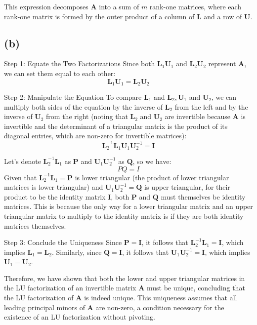 \documentclass{article}
\begin{document}
This expression decomposes $\boldsymbol{A}$ into a sum of $m$ rank-one matrices, where each rank-one matrix is formed by the outer product of a column of $\boldsymbol{L}$ and a row of $\boldsymbol{U}$.
\subsection{(b)}
Step 1: Equate the Two Factorizations
Since both $\boldsymbol{L}_1 \boldsymbol{U}_1$ and $\boldsymbol{L}_2 \boldsymbol{U}_2$ represent $\boldsymbol{A}$, we can set them equal to each other:
$$
\boldsymbol{L}_1 \boldsymbol{U}_1=\boldsymbol{L}_2 \boldsymbol{U}_2
$$

Step 2: Manipulate the Equation
To compare $\boldsymbol{L}_1$ and $\boldsymbol{L}_2, \boldsymbol{U}_1$ and $\boldsymbol{U}_2$, we can multiply both sides of the equation by the inverse of $\boldsymbol{L}_2$ from the left and by the inverse of $\boldsymbol{U}_2$ from the right (noting that $\boldsymbol{L}_2$ and $\boldsymbol{U}_2$ are invertible because $\boldsymbol{A}$ is invertible and the determinant of a triangular matrix is the product of its diagonal entries, which are non-zero for invertible matrices):
$$
\boldsymbol{L}_2^{-1} \boldsymbol{L}_1 \boldsymbol{U}_1 \boldsymbol{U}_2^{-1}=\boldsymbol{I}
$$

Let's denote $\boldsymbol{L}_2^{-1} \boldsymbol{L}_1$ as $\boldsymbol{P}$ and $\boldsymbol{U}_1 \boldsymbol{U}_2^{-1}$ as $\boldsymbol{Q}$, so we have:
$$
P Q=I
$$
Given that $\boldsymbol{L}_2^{-1} \boldsymbol{L}_1=\boldsymbol{P}$ is lower triangular (the product of lower triangular matrices is lower triangular) and $\boldsymbol{U}_1 \boldsymbol{U}_2^{-1}=\boldsymbol{Q}$ is upper triangular, for their product to be the identity matrix $\boldsymbol{I}$, both $\boldsymbol{P}$ and $\boldsymbol{Q}$ must themselves be identity matrices. This is because the only way for a lower triangular matrix and an upper triangular matrix to multiply to the identity matrix is if they are both identity matrices themselves.

Step 3: Conclude the Uniqueness
Since $\boldsymbol{P}=\boldsymbol{I}$, it follows that $\boldsymbol{L}_2^{-1} \boldsymbol{L}_1=\boldsymbol{I}$, which implies $\boldsymbol{L}_1=\boldsymbol{L}_2$. Similarly, since $\boldsymbol{Q}=\boldsymbol{I}$, it follows that $\boldsymbol{U}_1 \boldsymbol{U}_2^{-1}=\boldsymbol{I}$, which implies $\boldsymbol{U}_1=\boldsymbol{U}_2$.

Therefore, we have shown that both the lower and upper triangular matrices in the LU factorization of an invertible matrix $\boldsymbol{A}$ must be unique, concluding that the LU factorization of $\boldsymbol{A}$ is indeed unique. This uniqueness assumes that all leading principal minors of $\boldsymbol{A}$ are non-zero, a condition necessary for the existence of an LU factorization without pivoting.
\end{document}
